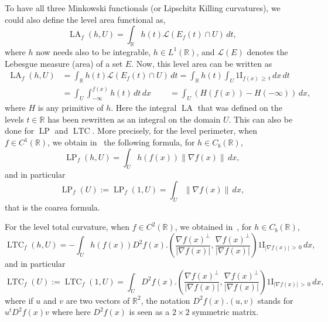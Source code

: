 \documentclass[AHL,Unicode,longabstracts,published]{cedram}
\newcommand{\R}{\mathbb{R}}
\newcommand{\ind}{{1\!\!\mathrm{I}}}
\DeclareMathOperator{\LTC}{LTC}
\DeclareMathOperator{\LP}{LP}
\DeclareMathOperator{\LA}{LA}
\newcommand{\calL}{\mathcal{L}}
\begin{document}
To have all three Minkowski functionals (or Lipschitz Killing curvatures), we could also define the level area functional as,
\[
\LA_f(h,U) = \int_\R h(t) \calL \left(E_f(t)\cap U\right) \, dt,
\]
where $h$ now needs also to be integrable, $h\in L^1(\R)$, and $\calL(E)$ denotes the Lebesgue measure (area) of a set $E$. Now, this level area can be written as
\begin{align*}
\LA_f(h,U) & = \int_\R h(t) \calL \left(E_f(t)\cap U\right) \, dt = \int_\R h(t)
\int_U \ind_{f(x)\,\geq\,t} \, dx \, dt \\
& = \int_U \int_{-\infty}^{f(x)} h(t) \, dt \, dx \qquad\:= \int_U \left(H(f(x)) - H(-\infty)\right) \, dx,
\end{align*}
where $H$ is any primitive of $h$. Here the integral $\LA$ that was defined on the levels $t\in\R$ has been rewritten as an integral on the domain $U$. This can also be done for $\LP$ and $\LTC$. More precisely, for the level perimeter, when $f \in C^1(\R)$, we obtain in~\cite{BD-A0P-2016} the following formula, for $h\in C_b(\R)$,
\begin{equation}\label{LPfsmooth:eq}
\LP_f (h,U) = \int_U h(f(x)) \left\|\nabla f(x)\right\| \, dx,
\end{equation}
and in particular
\begin{equation}\label{LPUfsmooth:eq}
\LP_f (U) := \LP_f (1,U) = \int_U \left\|\nabla f(x)\right\| \, dx,
\end{equation}
that is the coarea formula.


For the level total curvature, when $f \in C^2(\R)$, we obtained in~\cite{BD-Geometry-published}, for $h\in C_b(\R)$,
\begin{equation}\label{LTCfsmooth:eq}
\LTC_f (h,U) = - \int_U h(f(x)) D^2f(x).\left(\frac{\nabla f(x)^\perp}{|\nabla f(x)|}, \frac{\nabla f(x)^\perp}{|\nabla f(x)|} \right) \ind_{\left|\nabla f(x)\right|\,>\,0} \, dx,
\end{equation}
and in particular
\begin{equation}\label{LTCUfsmooth:eq}
\LTC_f (U) := \LTC_f (1,U) = \int_U D^2f(x).\left(\frac{\nabla f(x)^\perp}{|\nabla f(x)|}, \frac{\nabla f(x)^\perp}{|\nabla f(x)|} \right) \ind_{\left|\nabla f(x)\right|\,>\,0} \, dx,
\end{equation}
where if $u$ and $v$ are two vectors of $\R^2$, the notation $D^2f(x).(u,v)$ stands for $u^t D^2f(x) v$ where here $D^2f(x)$ is seen as a $2\times 2$ symmetric matrix.
\end{document}
